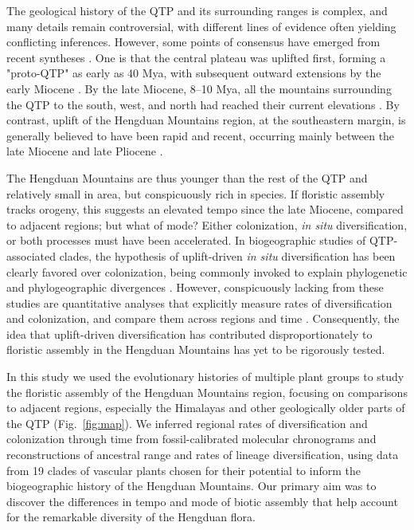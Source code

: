 \documentclass[9pt,twocolumn,twoside,lineno]{pnas-new}
\begin{document}
The geological history of the QTP and its surrounding ranges is
complex, and many details remain controversial, with different lines
of evidence often yielding conflicting inferences. However, some
points of consensus have emerged from recent syntheses
\citep{WangC2014,Favre2015,Deng2015,Renner2016}. One is that the
central plateau was uplifted first, forming a "proto-QTP" as early as
40 Mya, with subsequent outward extensions by the early Miocene
\citep{Rowley2006,WangC2014}. By the late Miocene, 8--10 Mya, all the
mountains surrounding the QTP to the south, west, and north had
reached their current elevations
\citep{Spicer2003,Fang2005,WangY2012,Deng2015}. By contrast, uplift of
the Hengduan Mountains region, at the southeastern margin, is
generally believed to have been rapid and recent, occurring mainly
between the late Miocene and late Pliocene
\citep{kirby2002,clark2005,WangE2012,Wang2014,Meng2016,SunB2011}.

The Hengduan Mountains are thus younger than the rest of the QTP and
relatively small in area, but conspicuously rich in species. If
floristic assembly tracks orogeny, this suggests an elevated tempo
since the late Miocene, compared to adjacent regions; but what of
mode? Either colonization, \textit{in situ} diversification, or both
processes must have been accelerated. In biogeographic studies of
QTP-associated clades, the hypothesis of uplift-driven \textit{in
  situ} diversification has been clearly favored over colonization,
being commonly invoked to explain phylogenetic and phylogeographic
divergences
\citep[e.g.,][]{LiuJ2006,WangY2009,ZhangJ2014,GaoY2013}. However,
conspicuously lacking from these studies are quantitative analyses
that explicitly measure rates of diversification and colonization, and
compare them across regions and time
\citep{Wen2014,Favre2015}. Consequently, the idea that uplift-driven
diversification has contributed disproportionately to floristic
assembly in the Hengduan Mountains has yet to be rigorously tested.

In this study we used the evolutionary histories of multiple plant
groups to study the floristic assembly of the Hengduan Mountains
region, focusing on comparisons to adjacent regions, especially the
Himalayas and other geologically older parts of the QTP
(Fig.~\ref{fig:map}). We inferred regional rates of diversification
and colonization through time from fossil-calibrated molecular
chronograms and reconstructions of ancestral range and rates of
lineage diversification, using data from 19 clades of vascular plants
chosen for their potential to inform the biogeographic history of the
Hengduan Mountains. Our primary aim was to discover the differences in
tempo and mode of biotic assembly that help account for the remarkable
diversity of the Hengduan flora.
\end{document}
